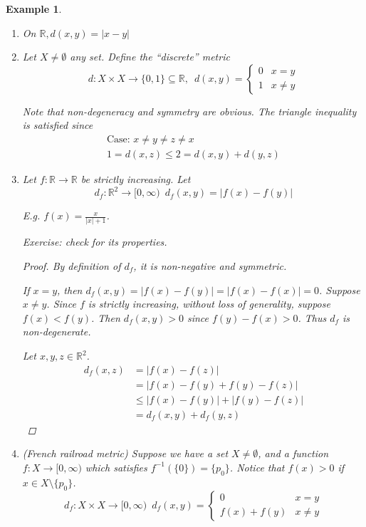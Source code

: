 \documentclass[11pt, oneside]{book}
\theoremstyle{break}
\newtheorem*{proof}{Proof}
\newtheorem{eg}{Example}[section]
\newcommand{\bb}[1]{\mathbb{#1}}			%
\begin{document}
\begin{eg}
	\begin{enumerate}
		\item On $\bb{R}, d(x,y) = |x - y|$
		\item Let $X \neq \emptyset$ any set. Define the ``discrete'' metric
			\begin{equation}
				d: X \times X \to \{0, 1\} \subseteq \bb{R}, \enspace d(x,y) =
					\begin{cases}
						0	&	x = y \\
						1	&	x \neq y
					\end{cases}
			\end{equation}

			Note that non-degeneracy and symmetry are obvious. The triangle inequality is satisfied since
			\begin{gather*}
				\text{Case: } x \neq y \neq z \neq x \\
				1 = d(x,z) \leq 2 = d(x,y) + d(y,z)
			\end{gather*}

		\item Let $f: \bb{R} \to \bb{R}$ be strictly increasing. Let
			\begin{equation}
				d_f: \bb{R}^2 \to [0, \infty) \enspace d_f(x,y) = |f(x) - f(y)|
			\end{equation}

			E.g. $f(x) = \frac{x}{|x| + 1}$.

			Exercise: check for its properties.
			\begin{proof}
				By definition of $d_f$, it is non-negative and symmetric.

				If $x = y$, then $d_f(x, y) = |f(x) - f(y)| = |f(x) - f(x)| = 0$. Suppose $x \neq y$. Since $f$ is strictly increasing, without loss of generality, suppose $f(x) < f(y)$. Then $d_f(x, y) > 0$ since $f(y) - f(x) > 0$. Thus $d_f$ is non-degenerate.

				Let $x, y, z \in \bb{R}^2$.
				\begin{align*}
					d_f(x, z) &= |f(x) - f(z)| \\
						&= |f(x) - f(y) + f(y) - f(z)| \\
						&\leq |f(x) - f(y)| + |f(y) - f(z)| \\
						&= d_f(x, y) + d_f(y, z)
				\end{align*}
			\end{proof}
			

		\item (French railroad metric) Suppose we have a set $X \neq \emptyset$, and a function $f: X \to [0, \infty)$ which satisfies $f^{-1}(\{0\}) = \{p_0\}$. Notice that $f(x) > 0$ if $x \in X \setminus \{p_0\}$.
			\begin{equation}
				d_f: X \times X \to [0, \infty) \enspace d_f (x, y) = 
				\begin{cases}
					0  &  x = y \\
					f(x) + f(y)  &  x \neq y
				\end{cases}
			\end{equation}


\end{enumerate}
\end{eg}
\end{document}
